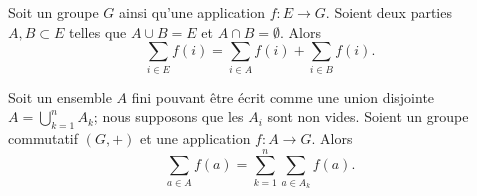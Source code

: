 \begin{lemma}	\label{LEMooQDFLooVTwJQq}
	Soit un groupe \( G\) ainsi qu'une application \(f \colon E\to G  \). Soient deux parties \( A,B\subset E\) telles que \( A\cup B=E\) et \( A\cap B=\emptyset\). Alors
	\begin{equation}
		\sum_{i\in E}f(i)=\sum_{i\in A}f(i)+\sum_{i\in B}f(i).
	\end{equation}
\end{lemma}


\begin{lemma}		\label{LEMooNDBYooAGEkmw}
	Soit un ensemble \( A\) fini pouvant être écrit comme une union disjointe \( A=\bigcup_{k=1}^nA_k\); nous supposons que les \( A_i\) sont non vides. Soient un groupe commutatif \( (G,+)\) et une application \( f\colon A\to G\). Alors
	\begin{equation}
		\sum_{a\in A}f(a)=\sum_{k=1}^n\sum_{a\in A_k}f(a).
	\end{equation}
\end{lemma}



